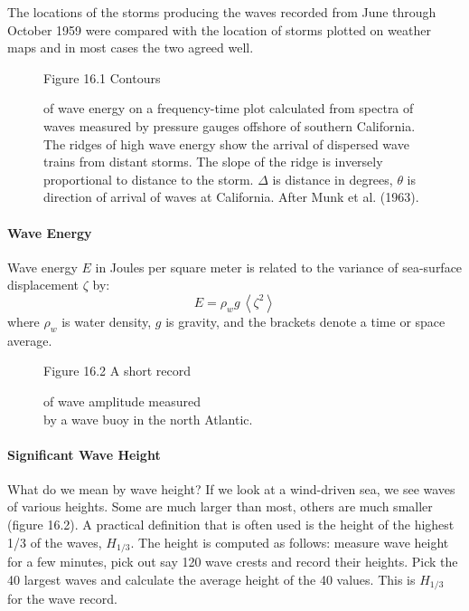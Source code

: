 The locations of the storms producing the waves recorded from June through
October 1959 were compared with the location of storms plotted on weather maps and in
most cases the two agreed well. 

\begin{figure}[t!]
\footnotesize
Figure 16.1 Contours \rule{0mm}{4ex}of wave energy on a frequency-time plot
calculated from spectra of waves measured by pressure gauges offshore of
southern California. The ridges of high wave energy show the arrival of
dispersed wave trains from distant storms. The slope of the ridge is inversely
proportional to distance to the storm.
$\Delta$ is distance in degrees, $\theta$ is direction of arrival of waves at
California. After Munk et al. (1963).
\label{fig:dispersedwaves}
\vspace{-3ex}
\end{figure}

\paragraph{Wave Energy}
Wave energy $E$ in Joules per square meter is related to the variance of
sea-surface displacement
$\zeta$ by:
 \begin{equation}
 E = \rho _{w} g \, \left< \zeta ^{2} \right>
 \end{equation}
where $\rho _{w}$ is water density, $g$ is gravity, and the brackets denote a
time or space average.

\begin{figure}[h!]
\vspace{1ex}
\centering
\footnotesize
Figure 16.2 A short record \rule{0mm}{3ex}of wave amplitude measured\\
by a wave buoy in the north Atlantic.

\label{fig:waveheight}
\vspace{-1ex}
\end{figure}

\paragraph{Significant Wave Height}
What do we mean by wave height? If we look at a
wind-driven sea, we see waves of various heights. Some are much larger than most, others are
much smaller (figure 16.2). A practical definition that is often used is the height of the
highest 1/3 of the waves, $H_{1/3}$. The height is computed as follows: measure wave height
for a few minutes, pick out say 120 wave crests and record their heights. Pick the 40 largest
waves and calculate the average height of the 40 values. This is $H_{1/3}$ for the wave record.

